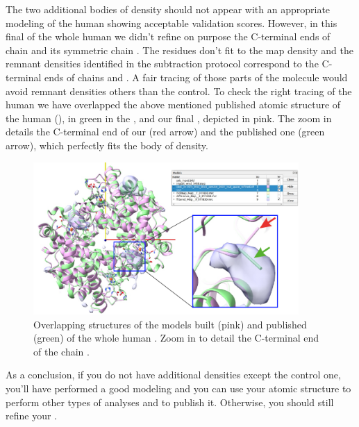 \begin{itemize}
The two additional bodies of density should not appear with an appropriate modeling of the human  showing acceptable validation scores. However, in this final  of the whole human  we didn't refine on purpose the C-terminal ends of chain  and its symmetric chain . The  residues don't fit to the map density and the remnant densities identified in the subtraction protocol correspond to the C-terminal ends of chains  and . A fair tracing of those parts of the molecule would avoid remnant densities others than the control. To check the right tracing of the human  we have overlapped the above mentioned published atomic structure of the human  (), in green in the , and our final , depicted in pink. The zoom in details the C-terminal end of our  (red arrow) and the published one (green arrow), which perfectly fits the body of density. 

  
  \begin{figure}[H]
    \centering 
    \captionsetup{width=.9\linewidth} 
    \includegraphics[width=0.90\textwidth]{Images/Fig44}
    \caption{Overlapping structures of the models built (pink) and published (green) of the whole human . Zoom in to detail the C-terminal end of the chain .}
    \label{fig:chimera_map_subtract_3}
   \end{figure}

   As a conclusion, if you do not have additional densities except the control one, you'll have performed a good modeling and you can use your atomic structure to perform other types of analyses and to publish it. Otherwise, you should still refine your .
 
\end{itemize}
